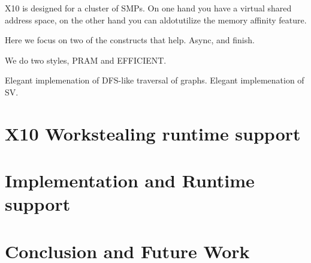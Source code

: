 \documentclass{llncs}
\begin{document}
X10 is designed for a cluster of SMPs. On one hand you have a virtual shared address space, on the other hand you can aldotutilize the memory affinity feature.   

Here we focus on two of the constructs that help. Async, and finish.

We do two styles, PRAM and EFFICIENT.

Elegant implemenation of DFS-like traversal of graphs. Elegant implemenation of SV.

\section{X10  Workstealing runtime support}
\label{s:runtime}

\section{Implementation and Runtime support }
\label{s:results}

\section{Conclusion and Future Work}
\label{s:concl}


\end{document}
